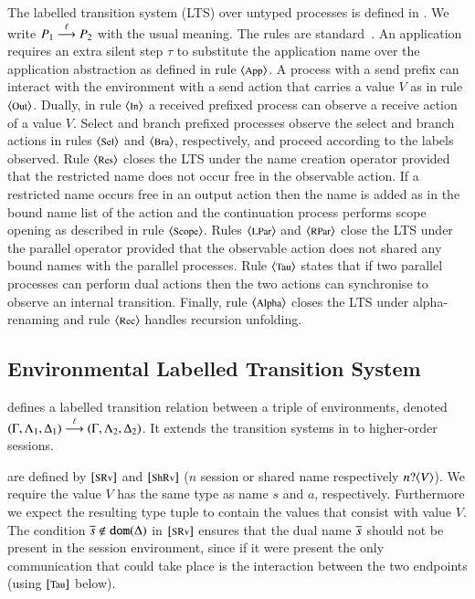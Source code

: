 The labelled transition system (LTS) over untyped processes
is defined in .
We write $P_1 \stackrel{\ell}{\longrightarrow} P_2$ with the usual meaning.
The rules are standard~\cite{KYHH2015,KY2015}.
An application requires an extra silent step $\tau$ to substitute
the application name over the application abstraction as defined
in rule ${\footnotesize \langle \textrm{App} \rangle}$.
A process with a send prefix can interact with the environment with a send
action that carries a value $V$ as in rule ${\footnotesize \langle \textrm{Out} \rangle}$.
Dually, in rule ${\footnotesize \langle \textrm{In} \rangle}$
a received prefixed process can observe a receive action of a value $V$.
Select and branch prefixed processes observe the select
and branch actions in rules ${\footnotesize \langle \textrm{Sel} \rangle}$ and ${\footnotesize \langle \textrm{Bra} \rangle}$, respectively,
and proceed according to the labels observed.
Rule ${\footnotesize \langle \textrm{Res} \rangle}$ closes the LTS under the name creation
operator provided that the restricted name does not occur free in the observable action.
If a restricted name occurs free in an output action 
then the name is added as in the bound name list of the action
and the continuation process performs scope opening as described in rule ${\footnotesize \langle \textrm{Scope} \rangle}$.
Rules ${\footnotesize \langle \textrm{LPar} \rangle}$ and ${\footnotesize \langle \textrm{RPar} \rangle}$ close the LTS under the parallel operator 
provided that the observable action does not shared any bound names with the 
parallel processes.
Rule ${\footnotesize \langle \textrm{Tau} \rangle}$ states that if two parallel processes can perform dual actions
then the two actions  can synchronise to observe an internal transition. 
Finally, rule ${\footnotesize \langle \textrm{Alpha} \rangle}$ closes  the LTS under alpha-renaming 
and rule ${\footnotesize \langle \textrm{Rec} \rangle}$ handles recursion unfolding.

\subsection{Environmental Labelled Transition System}



\label{ss:elts}
\noi 
{}
defines a labelled transition relation between 
a triple of environments, 
denoted
$(\Gamma, \Lambda_1, \Delta_1) \stackrel{\ell}{\longrightarrow} (\Gamma, \Lambda_2, \Delta_2)$.
It extends the transition systems
in \cite{KYHH2015,KY2015} 
to higher-order sessions. 

are defined by 
${\footnotesize [\textrm{SRv}]}$ and ${\footnotesize [\textrm{ShRv}]}$
($n$ session or shared name respectively $n ? \langle V \rangle$). 
We require the value $V$ has
the same type as name $s$ and $a$, respectively.  Furthermore we
expect the resulting type tuple to contain the values that consist
with value $V$. The condition $\overline{s} \notin \mathtt{dom}(\Delta)$
in ${\footnotesize [\textrm{SRv}]}$ ensures that 
the dual name $\overline{s}$ should not be
present in the session environment, since if it were present
the only communication that could take place is the interaction
between the two endpoints (using ${\footnotesize [\textrm{Tau}]}$ below).

